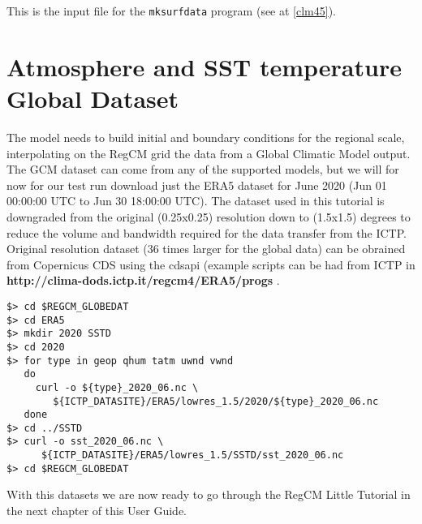 This is the input file for the \verb=mksurfdata= program (see at \ref{clm45}).

\section{Atmosphere and SST temperature Global Dataset}

The model needs to build initial and boundary conditions for the regional scale,
interpolating on the RegCM grid the data from a Global Climatic Model output.
The GCM dataset can come from any of the supported models, but we will for now
for our test run download just the ERA5 dataset for June 2020
(Jun 01 00:00:00 UTC to Jun 30 18:00:00 UTC). The dataset used in this tutorial
is downgraded from the original (0.25x0.25) resolution down to (1.5x1.5) degrees
to reduce the volume and bandwidth required for the data transfer from the
ICTP. Original resolution dataset (36 times larger for the global data) can be
obrained from Copernicus CDS using the cdsapi (example scripts can be had
from ICTP in {\bf http://clima-dods.ictp.it/regcm4/ERA5/progs }.

\begin{Verbatim}
$> cd $REGCM_GLOBEDAT
$> cd ERA5
$> mkdir 2020 SSTD
$> cd 2020
$> for type in geop qhum tatm uwnd vwnd
   do
     curl -o ${type}_2020_06.nc \
        ${ICTP_DATASITE}/ERA5/lowres_1.5/2020/${type}_2020_06.nc
   done
$> cd ../SSTD
$> curl -o sst_2020_06.nc \
      ${ICTP_DATASITE}/ERA5/lowres_1.5/SSTD/sst_2020_06.nc
$> cd $REGCM_GLOBEDAT
\end{Verbatim}

With this datasets we are now ready to go through the RegCM Little Tutorial
in the next chapter of this User Guide.
